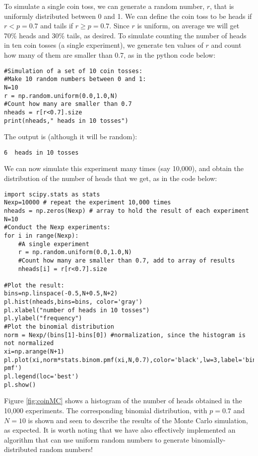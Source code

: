 To simulate a single coin toss, we can generate a random number, $r$, that is uniformly distributed between 0 and 1. We can define the coin toss to be heads if $r<p=0.7$ and tails if $r\geq p= 0.7$. Since $r$ is uniform, on average we will get 70\% heads and 30\% tails, as desired. To simulate counting the number of heads in ten coin tosses (a single experiment), we generate ten values of $r$ and count how many of them are smaller than 0.7, as in the python code below:
\begin{lstlisting}[frame=single] 
#Simulation of a set of 10 coin tosses:
#Make 10 random numbers between 0 and 1:
N=10
r = np.random.uniform(0.0,1.0,N)
#Count how many are smaller than 0.7
nheads = r[r<0.7].size
print(nheads," heads in 10 tosses")
\end{lstlisting}
The output is (although it will be random):
\begin{verbatim}
6  heads in 10 tosses
\end{verbatim}

We can now simulate this experiment many times (say 10,000), and obtain the distribution of the number of heads that we get, as in the code below:
\begin{lstlisting}[frame=single] 
import scipy.stats as stats
Nexp=10000 # repeat the experiment 10,000 times
nheads = np.zeros(Nexp) # array to hold the result of each experiment
N=10
#Conduct the Nexp experiments:
for i in range(Nexp):
    #A single experiment
    r = np.random.uniform(0.0,1.0,N)
    #Count how many are smaller than 0.7, add to array of results
    nheads[i] = r[r<0.7].size    
    
#Plot the result:
bins=np.linspace(-0.5,N+0.5,N+2)
pl.hist(nheads,bins=bins, color='gray')
pl.xlabel("number of heads in 10 tosses")
pl.ylabel("frequency")
#Plot the binomial distribution
norm = Nexp/(bins[1]-bins[0]) #normalization, since the histogram is not normalized
xi=np.arange(N+1)
pl.plot(xi,norm*stats.binom.pmf(xi,N,0.7),color='black',lw=3,label='binomial pmf')
pl.legend(loc='best')
pl.show()
\end{lstlisting}
Figure \ref{fig:coinMC} shows a histogram of the number of heads obtained in the 10,000 experiments. The corresponding binomial distribution, with $p=0.7$ and $N=10$ is shown and seen to describe the results of the Monte Carlo simulation, as expected. It is worth noting that we have also effectively implemented an algorithm that can use uniform random numbers to generate binomially-distributed random numbers!


